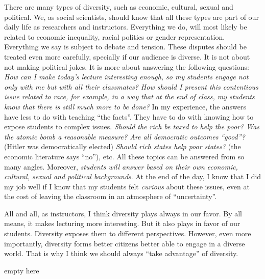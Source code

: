 \documentclass[11pt]{letter} %
\begin{document}
\begin{letter}{}
There are many types of diversity, such as economic, cultural, sexual and political. We, as social scientists, should know that all these types are part of our daily life as researchers and instructors. Everything we do, will most likely be related to economic inequality, racial politics or gender representation. Everything we say is subject to debate and tension. These disputes should be treated even more carefully, specially if our audience is diverse. It is not about not making political jokes. It is more about answering the following questions: \emph{How can I make today's lecture interesting enough, so my students engage not only with me but with all their classmates? How should I present this contentious issue related to race, for example, in a way that at the end of class, my students know that there is still much more to be done?} In my experience, the answers have less to do with teaching ``the facts''. They have to do with knowing how to expose students to complex issues. \emph{Should the rich be taxed to help the poor? Was the atomic bomb a reasonable measure? Are all democratic outcomes ``good''?} (Hitler was democratically elected) \emph{Should rich states help poor states?} (the economic literature says ``no''), etc. All these topics can be answered from so many angles. Moreover, \emph{students will answer based on their own economic, cultural, sexual and political backgrounds}. At the end of the day, I know that I did my job well if I know that my students felt \emph{curious} about these issues, even at the cost of leaving the classroom in an atmosphere of ``uncertainty''.




All and all, as instructors, I think diversity plays always in our favor. By all means, it makes lecturing more interesting. But it also plays in favor of our  students. Diversity exposes them to different perspectives. However, even more importantly, diversity forms better citizens better able to engage in a diverse world. That is why I think we should always ``take advantage'' of diversity.



\closing{{\color{white}empty here}}




\end{letter}
\end{document}
